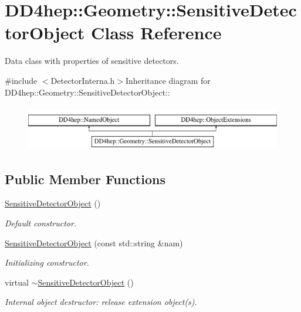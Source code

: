 \hypertarget{class_d_d4hep_1_1_geometry_1_1_sensitive_detector_object}{
\section{DD4hep::Geometry::SensitiveDetectorObject Class Reference}
\label{class_d_d4hep_1_1_geometry_1_1_sensitive_detector_object}
}


Data class with properties of sensitive detectors.  


{\ttfamily \#include $<$DetectorInterna.h$>$}Inheritance diagram for DD4hep::Geometry::SensitiveDetectorObject::\begin{figure}[H]
\begin{center}
\leavevmode
\includegraphics[height=2cm]{class_d_d4hep_1_1_geometry_1_1_sensitive_detector_object}
\end{center}
\end{figure}
\subsection*{Public Member Functions}
\begin{DoxyCompactItemize}
\item 
\hyperlink{class_d_d4hep_1_1_geometry_1_1_sensitive_detector_object_ada6df51a316e3a54c71889a0a7fbd8fd}{SensitiveDetectorObject} ()
\begin{DoxyCompactList}\small\item\em Default constructor. \item\end{DoxyCompactList}\item 
\hyperlink{class_d_d4hep_1_1_geometry_1_1_sensitive_detector_object_a663926f8216403d414c27ed7c57cc2c3}{SensitiveDetectorObject} (const std::string \&nam)
\begin{DoxyCompactList}\small\item\em Initializing constructor. \item\end{DoxyCompactList}\item 
virtual \hyperlink{class_d_d4hep_1_1_geometry_1_1_sensitive_detector_object_a56ae1536039de98974a535cf6f2e66a1}{$\sim$SensitiveDetectorObject} ()
\begin{DoxyCompactList}\small\item\em Internal object destructor: release extension object(s). \item\end{DoxyCompactList}\end{DoxyCompactItemize}
